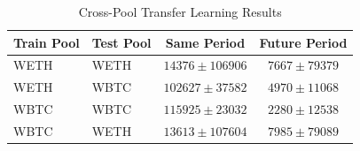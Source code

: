 \begin{table}[h]
\centering
\caption{Cross-Pool Transfer Learning Results}
\label{tab:transfer_learning}
\begin{tabular}{llcc}
\toprule
Train Pool & Test Pool & Same Period & Future Period \\
\midrule
WETH & WETH & $14376 \pm 106906$ & $7667 \pm 79379$ \\
WETH & WBTC & $102627 \pm 37582$ & $4970 \pm 11068$ \\
WBTC & WBTC & $115925 \pm 23032$ & $2280 \pm 12538$ \\
WBTC & WETH & $13613 \pm 107604$ & $7985 \pm 79089$ \\
\bottomrule
\end{tabular}
\end{table}